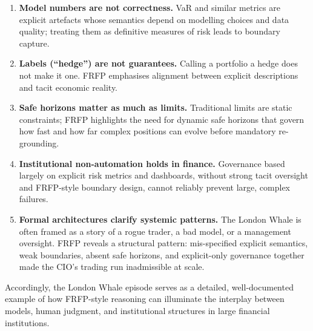 \begin{enumerate}
  \item \textbf{Model numbers are not correctness.}
        VaR and similar metrics are explicit artefacts whose semantics depend
        on modelling choices and data quality; treating them as definitive
        measures of risk leads to boundary capture.

  \item \textbf{Labels (``hedge'') are not guarantees.}
        Calling a portfolio a hedge does not make it one.
        FRFP emphasises alignment between explicit descriptions and tacit
        economic reality.

  \item \textbf{Safe horizons matter as much as limits.}
        Traditional limits are static constraints; FRFP highlights the need
        for dynamic safe horizons that govern how fast and how far complex
        positions can evolve before mandatory re-grounding.

  \item \textbf{Institutional non-automation holds in finance.}
        Governance based largely on explicit risk metrics and dashboards,
        without strong tacit oversight and FRFP-style boundary design, cannot
        reliably prevent large, complex failures.

  \item \textbf{Formal architectures clarify systemic patterns.}
        The London Whale is often framed as a story of a rogue trader, a bad
        model, or a management oversight.
        FRFP reveals a structural pattern: mis-specified explicit semantics,
        weak boundaries, absent safe horizons, and explicit-only governance
        together made the CIO’s trading run inadmissible at scale.
\end{enumerate}

Accordingly, the London Whale episode serves as a detailed, well-documented
example of how FRFP-style reasoning can illuminate the interplay between
models, human judgment, and institutional structures in large financial
institutions.


